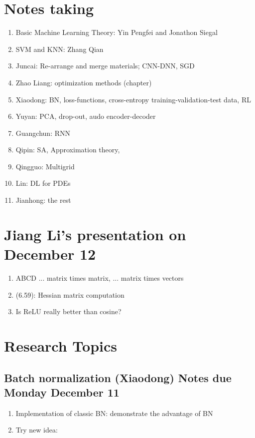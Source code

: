 \section{Notes taking}
\begin{enumerate}
\item Basic Machine Learning Theory:  Yin Pengfei and Jonathon Siegal
\item SVM and KNN:  Zhang Qian

\item Juncai:  Re-arrange and merge materials; CNN-DNN, SGD
\item Zhao Liang:  optimization methods (chapter)
\item Xiaodong: BN, loss-functions, cross-entropy
  training-validation-test data, RL
\item Yuyan:  PCA, drop-out, audo encoder-decoder
\item Guangchun:  RNN
\item Qipin: SA, Approximation theory,
\item Qingguo: Multigrid
\item Lin:  DL for PDEs
\item Jianhong: the rest
\end{enumerate}

\section{Jiang Li's presentation on December 12}
\begin{enumerate}
\item ABCD ... matrix times matrix, ... matrix times vectors 
\item (6.59): Hessian matrix computation
\item Is ReLU really better than cosine?
\end{enumerate}

\section{Research Topics}
\subsection{Batch normalization (Xiaodong)
\hfill Notes due Monday December 11}
\begin{enumerate}
\item Implementation of classic BN: demonstrate the advantage of BN
\item Try new idea:  
\end{enumerate}

